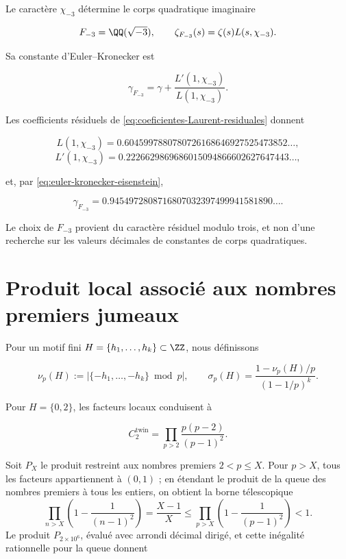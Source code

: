 Le caractère $\chi_{-3}$ détermine le corps quadratique imaginaire

\[
 F_{-3}=\QQ(\sqrt{-3}),
 \qquad
 \zeta_{F_{-3}}(s)=\zeta(s)L(s,\chi_{-3}).
\]

Sa constante d'Euler--Kronecker est

\begin{equation}
 \boxed{
 \gamma_{F_{-3}}
 =\gamma+\frac{L'(1,\chi_{-3})}{L(1,\chi_{-3})}}.
 \label{eq:euler-kronecker-eisenstein}
\end{equation}

Les coefficients résiduels de
\eqref{eq:coeficientes-Laurent-residuales} donnent

\[
 L(1,\chi_{-3})
 =0.6045997880780726168646927525473852\ldots,
\]
\[
 L'(1,\chi_{-3})
 =0.2226629869686015094866602627647443\ldots,
\]

et, par \eqref{eq:euler-kronecker-eisenstein},

\[
 \gamma_{F_{-3}}
 =0.9454972808716807032397499941581890\ldots.
\]

Le choix de $F_{-3}$ provient du caractère résiduel modulo trois, et non
d'une recherche sur les valeurs décimales de constantes de corps
quadratiques.

\section{Produit local associé aux nombres premiers jumeaux}

Pour un motif fini $H=\{h_1,\ldots,h_k\}\subset\ZZ$, nous définissons

\[
 \nu_p(H):=\left|\{-h_1,\ldots,-h_k\}\bmod p\right|,
 \qquad
 \sigma_p(H)=
 \frac{1-\nu_p(H)/p}{(1-1/p)^k}.
\]

Pour $H=\{0,2\}$, les facteurs locaux conduisent à

\begin{equation}
 C_2^{\mathrm{twin}}
 =\prod_{p>2}\frac{p(p-2)}{(p-1)^2}.
 \label{eq:constante-primos-gemelos}
\end{equation}

Soit \(P_X\) le produit restreint aux nombres premiers \(2<p\leq X\). Pour
\(p>X\), tous les facteurs appartiennent à \((0,1)\) ; en étendant le produit
de la queue des nombres premiers à tous les entiers, on obtient la borne
télescopique
\[
 \prod_{n>X}\left(1-\frac1{(n-1)^2}\right)
 =\frac{X-1}{X}
 \leq
 \prod_{p>X}\left(1-\frac1{(p-1)^2}\right)<1.
\]
Le produit \(P_{2\times10^6}\), évalué avec arrondi décimal dirigé, et
cette inégalité rationnelle pour la queue donnent

